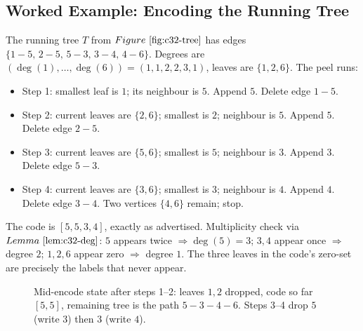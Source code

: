\subsection*{Worked Example: Encoding the Running Tree}

The running tree \(T\) from \(\figref{c32-tree}\) has edges
\(\{1\!-\!5,\,2\!-\!5,\,5\!-\!3,\,3\!-\!4,\,4\!-\!6\}\).  Degrees are
\((\deg(1),\dots,\deg(6))=(1,1,2,2,3,1)\), leaves are \(\{1,2,6\}\).  The
peel runs:

\begin{itemize}[nosep]
  \item Step 1: smallest leaf is \(1\); its neighbour is \(5\).  Append \(5\).
        Delete edge \(1\!-\!5\).
  \item Step 2: current leaves are \(\{2,6\}\); smallest is \(2\); neighbour
        is \(5\).  Append \(5\).  Delete edge \(2\!-\!5\).
  \item Step 3: current leaves are \(\{5,6\}\); smallest is \(5\); neighbour
        is \(3\).  Append \(3\).  Delete edge \(5\!-\!3\).
  \item Step 4: current leaves are \(\{3,6\}\); smallest is \(3\); neighbour
        is \(4\).  Append \(4\).  Delete edge \(3\!-\!4\).  Two vertices
        \(\{4,6\}\) remain; stop.
\end{itemize}

The code is \([5,5,3,4]\), exactly as advertised.  Multiplicity check via
\(\lemref{c32-deg}\): \(5\) appears twice \(\Rightarrow \deg(5)=3\); \(3,4\)
appear once \(\Rightarrow\) degree \(2\); \(1,2,6\) appear zero \(\Rightarrow\)
degree \(1\).  The three leaves in the code's zero-set are precisely the
labels that never appear.

\begin{figure}[H]
\centering
{}
\caption{Mid-encode state after steps 1--2: leaves \(1,2\) dropped, code so
far \([5,5]\), remaining tree is the path \(5\!-\!3\!-\!4\!-\!6\).  Steps 3--4
drop \(5\) (write \(3\)) then \(3\) (write \(4\)).}
\label{fig:c32-encode}
\end{figure}

